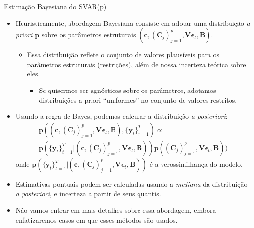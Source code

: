 \documentclass[11pt]{beamer}
\begin{document}
\begin{frame}{Estimação Bayesiana do SVAR(p)}
	\begin{itemize}
	 	\item Heuristicamente, abordagem Bayesiana consiste em adotar uma distribuição \textit{a priori} $\boldsymbol{p}$ sobre os parâmetros estruturais $(\boldsymbol{c}, (\boldsymbol{C}_j)_{j=1}^p, \boldsymbol{V}{\boldsymbol{\epsilon}_t}, \boldsymbol{B})$.
		\begin{itemize}
			\item Essa distribuição reflete o conjunto de valores plausíveis para os parâmetros estruturais (restrições), além de nossa incerteza teórica sobre eles.
			\begin{itemize}
				\item Se quisermos ser agnósticos sobre os parâmetros, adotamos distribuições a priori ``uniformes'' no conjunto de valores restritos.
			\end{itemize}
		\end{itemize}
		\item Usando a regra de Bayes, podemos calcular {\color{blue}a distribuição \textit{a posteriori}}:
		\begin{equation*}
			\begin{aligned}
				\boldsymbol{p}((\boldsymbol{c}, (\boldsymbol{C}_j)_{j=1}^p, \boldsymbol{V}{\boldsymbol{\epsilon}_t}, \boldsymbol{B}), \{\boldsymbol{y}_t\}_{t=1}^T) \propto \\ \boldsymbol{p}(\{\boldsymbol{y}_t\}_{t=1}^T|(\boldsymbol{c}, (\boldsymbol{C}_j)_{j=1}^p, \boldsymbol{V}{\boldsymbol{\epsilon}_t}, \boldsymbol{B})) \boldsymbol{p}((\boldsymbol{C}_j)_{j=1}^p, \boldsymbol{V}{\boldsymbol{\epsilon}_t}, \boldsymbol{B})) 
			\end{aligned}
		\end{equation*}
		onde $\boldsymbol{p}(\{\boldsymbol{y}_t\}_{t=1}^T|(\boldsymbol{c}, (\boldsymbol{C}_j)_{j=1}^p, \boldsymbol{V}{\boldsymbol{\epsilon}_t}, \boldsymbol{B}))$ é a verossimilhança do modelo.
		\item Estimativas pontuais podem ser calculadas usando a \textit{mediana} da distribuição \textit{a posteriori}, e incerteza a partir de seus quantis.
		\item Não vamos entrar em mais detalhes sobre essa abordagem, embora enfatizaremos casos em que esses métodos são usados.
	\end{itemize}
\end{frame}
\end{document}
